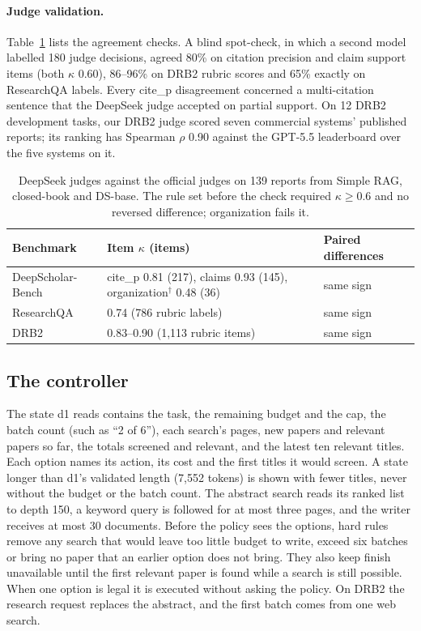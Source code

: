 \documentclass[11pt, letterpaper]{article}
\begin{document}
\paragraph{Judge validation.} Table~\ref{tab:judges} lists the agreement checks. A blind spot-check, in which
a second model labelled 180 judge decisions, agreed 80\% on citation precision and claim support items
(both $\kappa$ 0.60), 86--96\% on DRB2 rubric scores and 65\% exactly on ResearchQA labels. Every
cite\_p disagreement concerned a multi-citation sentence that the DeepSeek judge accepted on partial
support. On 12 DRB2 development tasks, our DRB2 judge scored seven commercial systems' published
reports; its ranking has Spearman $\rho$ 0.90 against the GPT-5.5 leaderboard over the five systems
on it.

\begin{table}[H]
\centering\footnotesize\setlength{\tabcolsep}{3pt}
\begin{tabular}{lll}
\toprule
Benchmark & Item $\kappa$ (items) & Paired differences\\
\midrule
DeepScholar-Bench & cite\_p 0.81 (217), claims 0.93 (145), organization$^\dagger$ 0.48 (36) & same sign\\
ResearchQA & 0.74 (786 rubric labels) & same sign\\
DRB2 & 0.83--0.90 (1,113 rubric items) & same sign\\
\bottomrule
\end{tabular}
\caption{DeepSeek judges against the official judges on 139 reports from Simple RAG, closed-book and
DS-base. The rule set before the check required $\kappa \ge 0.6$ and no reversed difference;
organization fails it.}
\label{tab:judges}
\end{table}

\subsection{The controller}
\label{app:controller}

The state d1 reads contains the task, the remaining budget and the cap, the batch
count (such as ``2 of 6''), each search's pages, new papers and relevant papers so far, the totals screened
and relevant, and the latest ten relevant titles. Each option names its action, its cost and the
first titles it would screen. A state longer than d1's validated length (7,552 tokens) is shown with
fewer titles, never without the budget or the batch count. The abstract search reads its ranked list
to depth 150, a keyword query is followed for at most three pages, and the writer receives at most
30 documents. Before the policy sees the options, hard rules remove any search that would leave too
little budget to write, exceed six batches or bring no paper that an earlier option does not bring.
They also keep finish unavailable until the first relevant paper is found while a search is still
possible. When one option is legal it is executed without asking the policy. On DRB2 the research
request replaces the abstract, and the first batch comes from one web search.
\end{document}
